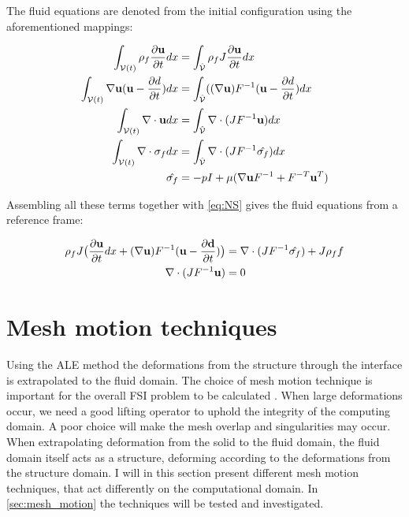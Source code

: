 The fluid equations are denoted from the initial configuration using the aforementioned mappings:

\begin{align}
\int_{\mathcal{V}(t)} \rho_f \frac{\partial \bold{u}}{\partial t} dx & = \int_{\hat{\mathcal{V}}}  \rho_f J \frac{\partial \bold{u}}{\partial t} dx \\
\int_{\mathcal{V}(t)} \nabla \bold{u} (\bold{u}-\frac{\partial d}{\partial t}) dx  &= \int_{\hat{\mathcal{V}}} ((\nabla \bold{u})F^{-1}(\bold{u}-\frac{\partial d}{\partial t}) dx  \\
\int_{\mathcal{V}(t)} \nabla \cdot \bold{u} dx  &=\int_{\hat{\mathcal{V}}}  \nabla \cdot (J F^{-1} \bold{u}  ) dx \\
\int_{\mathcal{V}(t)} \nabla \cdot \sigma_f dx &= \int_{\hat{\mathcal{V}}} \nabla \cdot( J F^{-1} \hat{\sigma_f} )     dx \\
\hat{\sigma_f} &= -pI + \mu ( \nabla \bold{u} F^{-1} + F^{-T} \bold{u}^{T}  ) 
\end{align}

Assembling all these terms together with \eqref{eq:NS} gives the fluid equations from a reference frame:

\begin{align}
\label{eq:NS_mapped}
\rho_f J \big( \frac{\partial \bold{u}}{\partial t} dx + (\nabla \bold{u})F^{-1}(\bold{u}-\frac{\partial \bold{d}}{\partial t}) \big) &= \nabla \cdot( J F^{-1} \hat{\sigma_f} ) + J \rho_f f \\
\nabla \cdot (J F^{-1} \bold{u} ) &= 0
\end{align} 

\section{Mesh motion techniques} \label{sec:meshmotion}
Using the ALE method the deformations from the structure through the interface is extrapolated to the fluid domain. The choice of mesh motion technique is important for the overall FSI problem to be calculated \cite{Wick2011a}. When large deformations occur, we need a good lifting operator to uphold the integrity of the computing domain. A poor choice will make the mesh overlap and singularities may occur. 
When extrapolating deformation from the solid to the fluid domain, the fluid domain itself acts as a structure, deforming according to the deformations from the structure domain.
I will in this section present different mesh motion techniques, that act differently on the computational domain. In \ref{sec:mesh_motion} the techniques will be tested and investigated.

